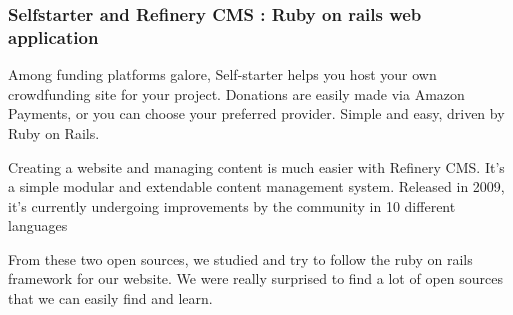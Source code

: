 \documentclass[conference]{IEEEtran}
\begin{document}
\subsubsection{Selfstarter and Refinery CMS : Ruby on rails web application}

Among funding platforms galore, Self-starter helps you host your own crowdfunding site for your project. Donations are easily made via Amazon Payments, or you can choose your preferred provider. Simple and easy, driven by Ruby on Rails.

Creating a website and managing content is much easier with Refinery CMS. It's a simple modular and extendable content management system. Released in 2009, it's currently undergoing improvements by the community in 10 different languages

From these two open sources, we studied and try to follow the ruby on rails framework for our website. We were really surprised to find a lot of open sources that we can easily find and learn.
\end{document}
